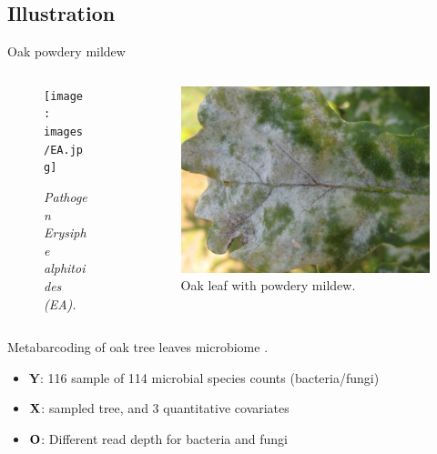 \documentclass[11pt]{beamer}
\newcommand\Ob{{\bf O}}
\newcommand\Xb{{\bf X}}
\newcommand{\Ybf}{{\boldsymbol{Y}}}
\begin{document}
\subsection{Illustration}
\begin{frame}{Oak powdery mildew}
\begin{columns}
\begin{column}{5cm}
\begin{figure}[htp]
\centering
\texttt{[image: images/EA.jpg]}
\caption{\textit{Pathogen Erysiphe alphitoides (EA).}}
\end{figure}
\end{column}
\begin{column}{6cm}
\begin{figure}[htp]
\centering
\includegraphics[scale=0.1]{images/mildew.jpg}
\caption{Oak leaf with powdery mildew.}
\end{figure}
\end{column}
\end{columns}
\vspace{0.5cm}
Metabarcoding of oak tree leaves microbiome \cite{jakuch}.\\

\begin{itemize}
	\item $\Ybf$: 116 sample of 114 microbial species counts (bacteria/fungi)
	\item $\Xb$: sampled tree, and 3 quantitative covariates 
	\item $\Ob$: Different read depth for bacteria and fungi
\end{itemize}
\end{frame}
\end{document}
